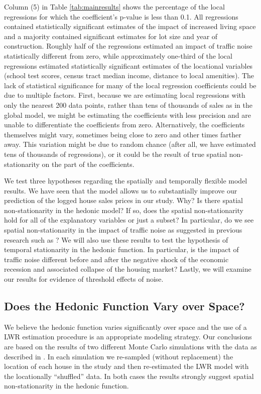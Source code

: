 \documentclass{article}\usepackage{graphicx, color}
\begin{document}
Column (5) in Table \ref{tab:mainresults} shows the percentage of the local regressions for which the coefficient's p-value is less than 0.1. All regressions contained statistically significant estimates of the impact of increased living space and a majority contained significant estimates for lot size and year of construction. Roughly half of the regressions estimated an impact of traffic noise statistically different from zero, while approximately one-third of the local regressions estimated statistically significant estimates of the locational variables (school test scores, census tract median income, distance to local amenities). The lack of statistical significance for many of the local regression coefficients could be due to multiple factors. First, because we are estimating local regressions with only the nearest 200 data points, rather than tens of thousands of sales as in the global model, we might be estimating the coefficients with less precision and are unable to differentiate the coefficients from zero. Alternatively, the coefficients themselves might vary, sometimes being close to zero and other times farther away. This variation might be due to random chance (after all, we have estimated tens of thousands of regressions), or it could be the result of true spatial non-stationarity on the part of the coefficients. 

We test three hypotheses regarding the spatially and temporally flexible model results. We have seen that the model allows us to substantially improve our prediction of the logged house sales prices in our study. Why? Is there spatial non-stationarity in the hedonic model? If so, does the spatial non-stationarity hold for all of the explanatory variables or just a subset? In particular, do we see spatial non-stationarity in the impact of traffic noise as suggested in previous research such as \citet{MarmolejoDuarteCarlos;GonzalezTamez2009}? We will also use these results to test the hypothesis of temporal stationarity in the hedonic function. In particular, is the impact of traffic noise different before and after the negative shock of the economic recession and associated collapse of the housing market? Lastly, we will examine our results for evidence of threshold effects of noise. 

\subsection{Does the Hedonic Function Vary over Space?}
We believe the hedonic function varies significantly over space and the use of a LWR estimation procedure is an appropriate modeling strategy. Our conclusions are based on the results of two different Monte Carlo simulations with the data as described in \citet{Fotheringham2002}. In each simulation we re-sampled (without replacement) the location of each house in the study and then re-estimated the LWR model with the locationally ``shuffled'' data. In both cases the results strongly suggest spatial non-stationarity in the hedonic function. 
\end{document}
